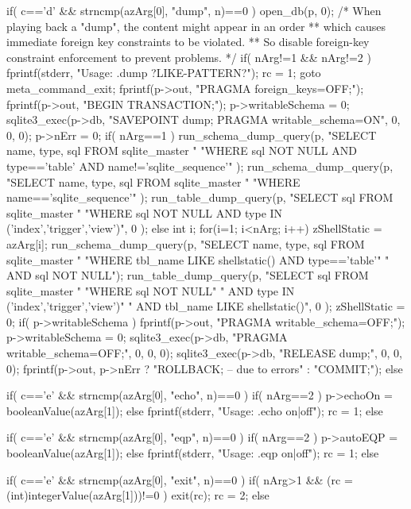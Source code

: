 \begin{Codex}[label=shell.c,numbers=left]
{  if( c=='d' && strncmp(azArg[0], "dump", n)==0 ){
    open_db(p, 0);
    /* When playing back a "dump", the content might appear in an order
    ** which causes immediate foreign key constraints to be violated.
    ** So disable foreign-key constraint enforcement to prevent problems. */
    if( nArg!=1 && nArg!=2 ){
      fprintf(stderr, "Usage: .dump ?LIKE-PATTERN?\n");
      rc = 1;
      goto meta_command_exit;
    }
    fprintf(p->out, "PRAGMA foreign_keys=OFF;\n");
    fprintf(p->out, "BEGIN TRANSACTION;\n");
    p->writableSchema = 0;
    sqlite3_exec(p->db, "SAVEPOINT dump; PRAGMA writable_schema=ON", 0, 0, 0);
    p->nErr = 0;
    if( nArg==1 ){
      run_schema_dump_query(p, 
        "SELECT name, type, sql FROM sqlite_master "
        "WHERE sql NOT NULL AND type=='table' AND name!='sqlite_sequence'"
      );
      run_schema_dump_query(p, 
        "SELECT name, type, sql FROM sqlite_master "
        "WHERE name=='sqlite_sequence'"
      );
      run_table_dump_query(p,
        "SELECT sql FROM sqlite_master "
        "WHERE sql NOT NULL AND type IN ('index','trigger','view')", 0
      );
    }else{
      int i;
      for(i=1; i<nArg; i++){
        zShellStatic = azArg[i];
        run_schema_dump_query(p,
          "SELECT name, type, sql FROM sqlite_master "
          "WHERE tbl_name LIKE shellstatic() AND type=='table'"
          "  AND sql NOT NULL");
        run_table_dump_query(p,
          "SELECT sql FROM sqlite_master "
          "WHERE sql NOT NULL"
          "  AND type IN ('index','trigger','view')"
          "  AND tbl_name LIKE shellstatic()", 0
        );
        zShellStatic = 0;
      }
    }
    if( p->writableSchema ){
      fprintf(p->out, "PRAGMA writable_schema=OFF;\n");
      p->writableSchema = 0;
    }
    sqlite3_exec(p->db, "PRAGMA writable_schema=OFF;", 0, 0, 0);
    sqlite3_exec(p->db, "RELEASE dump;", 0, 0, 0);
    fprintf(p->out, p->nErr ? "ROLLBACK; -- due to errors\n" : "COMMIT;\n");
  }else

  if( c=='e' && strncmp(azArg[0], "echo", n)==0 ){
    if( nArg==2 ){
      p->echoOn = booleanValue(azArg[1]);
    }else{
      fprintf(stderr, "Usage: .echo on|off\n");
      rc = 1;
    }
  }else

  if( c=='e' && strncmp(azArg[0], "eqp", n)==0 ){
    if( nArg==2 ){
      p->autoEQP = booleanValue(azArg[1]);
    }else{
      fprintf(stderr, "Usage: .eqp on|off\n");
      rc = 1;
    }   
  }else

  if( c=='e' && strncmp(azArg[0], "exit", n)==0 ){
    if( nArg>1 && (rc = (int)integerValue(azArg[1]))!=0 ) exit(rc);
    rc = 2;
  }else

}
\end{Codex}
